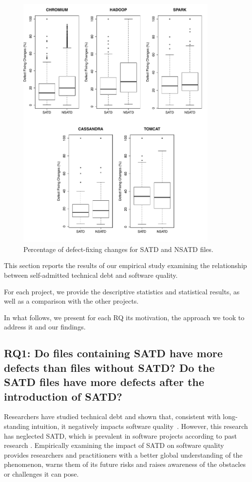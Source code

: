 \begin{figure}[tb]
	\centering
	\includegraphics[width=100mm]{figures/chapter3/rq1_correction}
	\caption{Percentage of defect-fixing changes for SATD and NSATD files.}
	\label{figure:number_of_fixing_changes_TD_vs_NTD}
\end{figure}

This section reports the results of our empirical study examining the relationship between self-admitted technical debt and software quality. 

For each project, we provide the descriptive statistics and statistical results, as well as a comparison with the other projects. 



In what follows, we present for each RQ its motivation, the approach we took to address it and our findings.


\subsection*{RQ1: Do files containing SATD have more defects than files without SATD? Do the SATD files have more defects after the introduction of SATD?}

 Researchers have studied technical debt and shown that, consistent with long-standing intuition, it negatively impacts software quality~\cite{zazworka2011investigating}. However, this research has neglected SATD, which is prevalent in software projects according to past research \cite{ICSM_PotdarS14}. Empirically examining the impact of SATD on software quality provides researchers and practitioners with a better global understanding of the phenomenon, warns them of its future risks and raises awareness of the obstacles or challenges it can pose.

